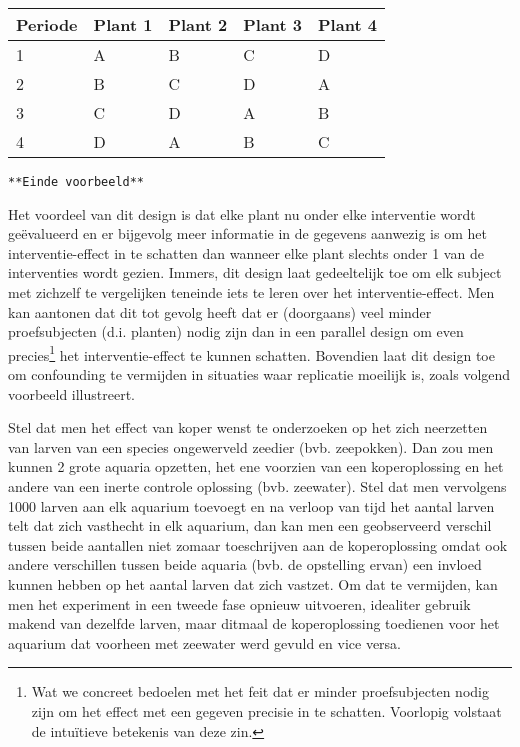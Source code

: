 \documentclass[12pt,dutch,coursenotes]{book}
\let\rmarkdownfootnote\footnote%
\def\footnote{\protect\rmarkdownfootnote}
\theoremstyle{definition}
\theoremstyle{definition}
\theoremstyle{definition}
\theoremstyle{remark}
\let\BeginKnitrBlock\begin \let\EndKnitrBlock\end
\begin{document}
\begin{longtable}[]{@{}lllll@{}}
\toprule
Periode & Plant 1 & Plant 2 & Plant 3 & Plant 4\tabularnewline
\midrule
\endhead
1 & A & B & C & D\tabularnewline
2 & B & C & D & A\tabularnewline
3 & C & D & A & B\tabularnewline
4 & D & A & B & C\tabularnewline
\bottomrule
\end{longtable}

\texttt{**Einde\ voorbeeld**}

Het voordeel van dit design is dat elke plant nu onder elke interventie
wordt geëvalueerd en er bijgevolg meer informatie in de gegevens
aanwezig is om het interventie-effect in te schatten dan wanneer elke
plant slechts onder 1 van de interventies wordt gezien. Immers, dit
design laat gedeeltelijk toe om elk subject met zichzelf te vergelijken
teneinde iets te leren over het interventie-effect. Men kan aantonen dat
dit tot gevolg heeft dat er (doorgaans) veel minder proefsubjecten (d.i.
planten) nodig zijn dan in een parallel design om even precies\footnote{Wat
  we concreet bedoelen met het feit dat er minder proefsubjecten nodig
  zijn om het effect met een gegeven precisie in te schatten. Voorlopig
  volstaat de intuïtieve betekenis van deze zin.} het interventie-effect
te kunnen schatten. Bovendien laat dit design toe om confounding te
vermijden in situaties waar replicatie moeilijk is, zoals volgend
voorbeeld illustreert.

\BeginKnitrBlock{example}[Effect van koper op neerstrijken van larven]
\protect\hypertarget{exm:unnamed-chunk-23}{}{\label{exm:unnamed-chunk-23}
\iffalse (Effect van koper op neerstrijken van larven) \fi{} }
\EndKnitrBlock{example}

Stel dat men het effect van koper wenst te onderzoeken op het zich
neerzetten van larven van een species ongewerveld zeedier (bvb.
zeepokken). Dan zou men kunnen 2 grote aquaria opzetten, het ene
voorzien van een koperoplossing en het andere van een inerte controle
oplossing (bvb. zeewater). Stel dat men vervolgens 1000 larven aan elk
aquarium toevoegt en na verloop van tijd het aantal larven telt dat zich
vasthecht in elk aquarium, dan kan men een geobserveerd verschil tussen
beide aantallen niet zomaar toeschrijven aan de koperoplossing omdat ook
andere verschillen tussen beide aquaria (bvb. de opstelling ervan) een
invloed kunnen hebben op het aantal larven dat zich vastzet. Om dat te
vermijden, kan men het experiment in een tweede fase opnieuw uitvoeren,
idealiter gebruik makend van dezelfde larven, maar ditmaal de
koperoplossing toedienen voor het aquarium dat voorheen met zeewater
werd gevuld en vice versa.
\end{document}
